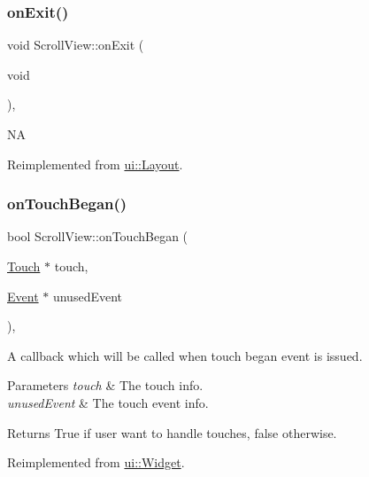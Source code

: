 \subsubsection{\texorpdfstring{on\+Exit()}{onExit()}}
{\footnotesize\ttfamily void Scroll\+View\+::on\+Exit (\begin{DoxyParamCaption}\item[{void}]{ }\end{DoxyParamCaption})\hspace{0.3cm}{\ttfamily [override]}, {\ttfamily [virtual]}}

NA 

Reimplemented from \hyperlink{classui_1_1Layout_a6444f3e3f124723e75f80b3d36408e34}{ui\+::\+Layout}.

\mbox{\label{classui_1_1ScrollView_a8cef5058b831f9b3644d894408371245}} 
\subsubsection{\texorpdfstring{on\+Touch\+Began()}{onTouchBegan()}\hspace{0.1cm}{\footnotesize\ttfamily [1/2]}}
{\footnotesize\ttfamily bool Scroll\+View\+::on\+Touch\+Began (\begin{DoxyParamCaption}\item[{\hyperlink{classTouch}{Touch} $\ast$}]{touch,  }\item[{\hyperlink{classEvent}{Event} $\ast$}]{unused\+Event }\end{DoxyParamCaption})\hspace{0.3cm}{\ttfamily [override]}, {\ttfamily [virtual]}}

A callback which will be called when touch began event is issued. 
\begin{DoxyParams}{Parameters}
{\em touch} & The touch info. \\
\hline
{\em unused\+Event} & The touch event info. \\
\hline
\end{DoxyParams}
\begin{DoxyReturn}{Returns}
True if user want to handle touches, false otherwise. 
\end{DoxyReturn}


Reimplemented from \hyperlink{classui_1_1Widget_a7885c770dde6daef771515c9857674a8}{ui\+::\+Widget}.

